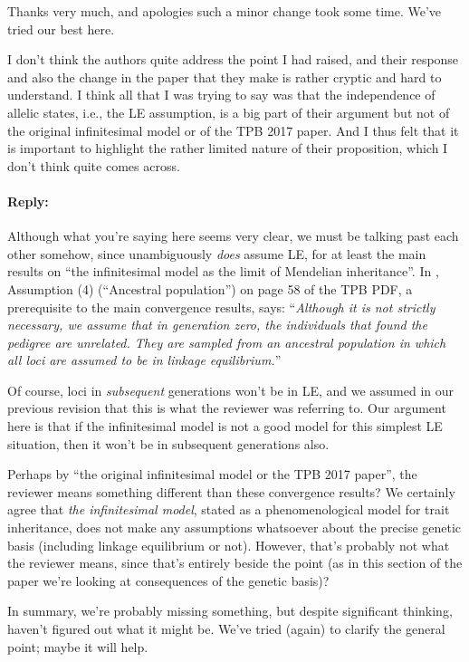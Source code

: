 Thanks very much, and apologies such a minor change took some time.
We've tried our best here.



\begin{point}{}
I don't think the authors quite address the point I had raised, and their
response and also the change in the paper that they make \revref{} is
rather cryptic and hard to understand. I think all that I was trying to say was
that the independence of allelic states, i.e., the LE assumption, is a big part
of their argument but not of the original infinitesimal model or of the TPB
2017 paper. And I thus felt that it is important to highlight the rather
limited nature of their proposition, which I don't think quite comes across.
\end{point}

\paragraph{Reply:}
Although what you're saying here seems very clear,
we must be talking past each other somehow,
since \citet{barton2017infinitesimal} unambiguously \emph{does} assume LE,
for at least the main results on
``the infinitesimal model as the limit of Mendelian inheritance''.
In \citet{barton2017infinitesimal}, Assumption (4) (``Ancestral population'')
on page 58 of the TPB PDF,
a prerequisite to the main convergence results, says:
``\emph{Although it is not strictly necessary,
we assume that in generation zero, the individuals that
found the pedigree are unrelated. They are sampled from
an ancestral population in which all loci are assumed to be
in linkage equilibrium.}''

Of course, loci in \emph{subsequent} generations won't be in LE,
and we assumed in our previous revision that this is what the reviewer was referring to.
Our argument here is that if the infinitesimal model
is not a good model for this simplest LE situation,
then it won't be in subsequent generations also.

Perhaps by ``the original infinitesimal model or the TPB 2017 paper'',
the reviewer means something different than these convergence results?
We certainly agree that \emph{the infinitesimal model},
stated as a phenomenological model for trait inheritance,
does not make any assumptions whatsoever about the precise genetic basis
(including linkage equilibrium or not).
However, that's probably not what the reviewer means, since that's entirely
beside the point (as in this section of the paper we're looking at
consequences of the genetic basis)?

In summary, we're probably missing something,
but despite significant thinking, haven't figured out what it might be.
We've tried (again) to clarify the general point;
maybe it will help.

